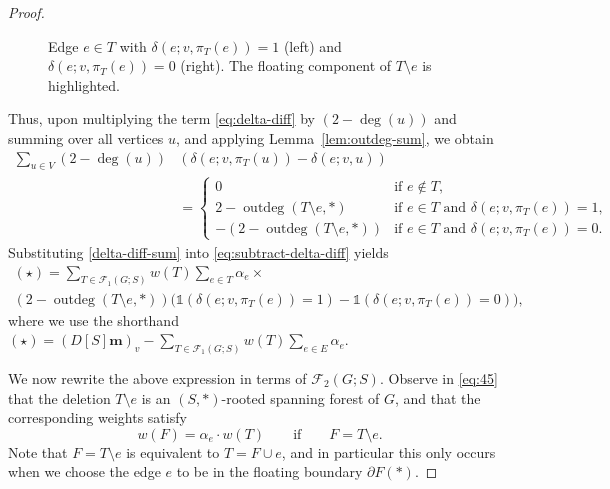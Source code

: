 \documentclass[12pt]{amsart}
\theoremstyle{definition}
\newcommand{\one}{\mathds{1}}
\newcommand{\boldm}{\mathbf{m}}
\newcommand{\trees}{\mathcal{F}_1}
\newcommand{\forests}{\mathcal{F}}
\DeclareMathOperator{\outdeg}{outdeg}
\begin{document}
\begin{proof}
\begin{figure}[h]
\begin{minipage}{0.45\textwidth}
\end{minipage}
\caption{Edge $e \in T$ with $\delta(e; v, \pi_T(e)) = 1$ (left) and $\delta(e; v, \pi_T(e)) = 0$ (right). The floating component of $T \setminus e$ is highlighted.}
\label{fig:e-delete-from-forest}
\end{figure}

Thus, upon multiplying the term \eqref{eq:delta-diff} by $(2 - \deg(u))$ and summing over all vertices $u$, and applying Lemma~\ref{lem:outdeg-sum}, we obtain
\begin{align}
	\sum_{u \in V} (2 - \deg(u)) &\left(\delta(e; v, \pi_T(u)) - \delta(e; v, u)\right) \nonumber \\
	&= \begin{cases}
	0 &\text{if } e \not \in T, \\
	2 - \outdeg(T \setminus e, *) &\text{if } e \in T \text{ and } \delta(e; v, \pi_T(e)) = 1, \\
	-(2 - \outdeg(T \setminus e, *)) &\text{if } e \in T \text{ and } \delta(e; v, \pi_T(e)) = 0 .
	\end{cases} \label{delta-diff-sum}
\end{align}
Substituting \eqref{delta-diff-sum} into \eqref{eq:subtract-delta-diff} yields
\begin{multline}\label{eq:45}
	(\star)
	= \sum_{T\in \trees(G;S)} \! w({T}) \sum_{e \in T} \alpha_e \times \\
	( 2 - \outdeg(T\setminus e,*)) \Big( \one(\delta(e; v, \pi_T(e)) = 1) \! - \one(\delta(e; v, \pi_T(e)) = 0) \Big),
\end{multline}
where we use the shorthand
$\displaystyle
	(\star) = (D[S] \boldm)_v - \sum_{T \in \trees(G;S)} w({T}) \sum_{e \in E} \alpha_e.
$

We now rewrite the above expression in terms of $\forests_2(G;S)$.
Observe in \eqref{eq:45} that the deletion $T \setminus e$ is an $(S,*)$-rooted spanning forest of $G$, and that the corresponding weights satisfy
\[
	w({F}) = \alpha_e \cdot w({T}) \qquad\text{if}\qquad F = T \setminus e.
\]
Note that $F = T \setminus e$ is equivalent to $T = F \cup e$, and in particular this only occurs when we choose the edge $e$ to be in the floating boundary $\partial F(*)$.


\end{proof}
\end{document}
